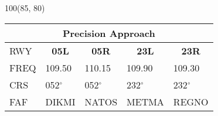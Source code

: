 \documentclass[10pt,landscape,a4paper]{article}
\begin{document}
\begin{textblock}{100}(85, 80)
\begin{table}[]
\begin{tabular}{lllll}
\multicolumn{5}{c}{\textbf{Precision Approach}} \\ \hline
\multicolumn{1}{|l|}{RWY} & \multicolumn{1}{c|}{\textbf{05L}} & \multicolumn{1}{c|}{\textbf{05R}} & \multicolumn{1}{c|}{\textbf{23L}} & \multicolumn{1}{c|}{\textbf{23R}} \\ \hline
\multicolumn{1}{|l|}{FREQ} & \multicolumn{1}{l|}{109.50} & \multicolumn{1}{l|}{110.15} & \multicolumn{1}{l|}{109.90} & \multicolumn{1}{l|}{109.30} \\
\multicolumn{1}{|l|}{CRS} & \multicolumn{1}{l|}{052$^\circ$} & \multicolumn{1}{l|}{052$^\circ$} & \multicolumn{1}{l|}{232$^\circ$} & \multicolumn{1}{l|}{232$^\circ$} \\
\multicolumn{1}{|l|}{FAF} & \multicolumn{1}{l|}{DIKMI} & \multicolumn{1}{l|}{NATOS} & \multicolumn{1}{l|}{METMA} & \multicolumn{1}{l|}{REGNO} \\ \hline
\end{tabular}
\end{table}
\end{textblock}
\end{document}
